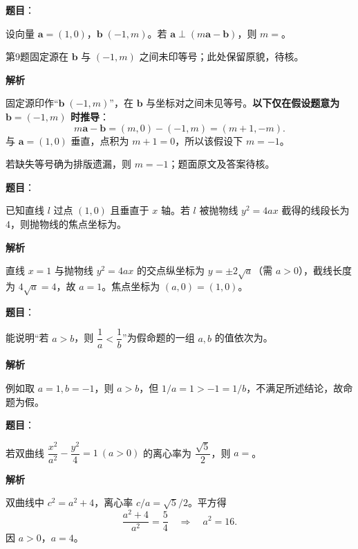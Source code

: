 \begin{answer}

\textbf{题目}：

设向量 $\boldsymbol a=(1,0)$，$\boldsymbol b\;(-1,m)$。若 $\boldsymbol a\perp(m\boldsymbol a-\boldsymbol b)$，则 $m=$\gkblank{}。

\begin{gktip}
第9题固定源在 $\boldsymbol b$ 与 $(-1,m)$ 之间未印等号；此处保留原貌，待核。
\end{gktip}

\textbf{解析}

固定源印作“$\boldsymbol b\;(-1,m)$”，在 $\boldsymbol b$ 与坐标对之间未见等号。\textbf{以下仅在假设题意为 $\boldsymbol b=(-1,m)$ 时推导}：
\nopagebreak[4]
\[
m\boldsymbol a-\boldsymbol b=(m,0)-(-1,m)=(m+1,-m).
\]
与 $\boldsymbol a=(1,0)$ 垂直，点积为 $m+1=0$，所以该假设下 $m=-1$。

若缺失等号确为排版遗漏，则 $m=-1$；题面原文及答案待核。


\end{answer}
\begin{answer}

\textbf{题目}：

已知直线 $l$ 过点 $(1,0)$ 且垂直于 $x$ 轴。若 $l$ 被抛物线 $y^2=4ax$ 截得的线段长为 $4$，则抛物线的焦点坐标为\gkblank{}。

\textbf{解析}

直线 $x=1$ 与抛物线 $y^2=4ax$ 的交点纵坐标为 $y=\pm2\sqrt a$（需 $a>0$），截线长度为 $4\sqrt a=4$，故 $a=1$。焦点坐标为 $(a,0)=(1,0)$。


\end{answer}
\begin{answer}

\textbf{题目}：

能说明“若 $a>b$，则 $\dfrac1a<\dfrac1b$”为假命题的一组 $a,b$ 的值依次为\gkblank{}。

\textbf{解析}

例如取 $a=1,b=-1$，则 $a>b$，但 $1/a=1>-1=1/b$，不满足所述结论，故命题为假。


\end{answer}
\begin{answer}

\textbf{题目}：

若双曲线 $\dfrac{x^2}{a^2}-\dfrac{y^2}{4}=1\ (a>0)$ 的离心率为 $\dfrac{\sqrt5}{2}$，则 $a=$\gkblank{}。

\textbf{解析}

双曲线中 $c^2=a^2+4$，离心率 $c/a=\sqrt5/2$。平方得
\nopagebreak[4]
\[
\frac{a^2+4}{a^2}=\frac54\quad\Longrightarrow\quad a^2=16.
\]
因 $a>0$，$a=4$。


\end{answer}
